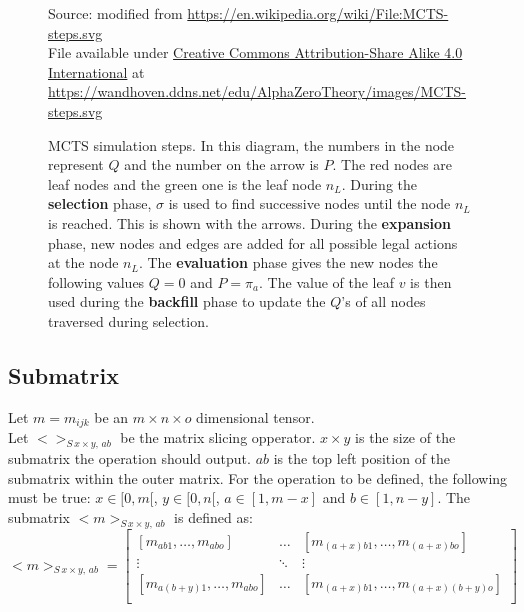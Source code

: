 \documentclass[12pt]{article}
\newcommand{\source}[1]{\caption*{Source: {#1}} }
\begin{document}
\begin{figure}
    \centering
	\captionsetup{width=.9\linewidth}
    
		\caption[width=0.7\columnwidth]{MCTS simulation steps. In this diagram, the numbers in the node represent \(Q\) and the number on the arrow is \(P\). The red nodes are leaf nodes and the green one is the leaf node \(n_L\). During the \textbf{selection} phase, \(\sigma\) is used to find successive nodes until the node \(n_L\) is reached. This is shown with the arrows. During the \textbf{expansion} phase, new nodes and edges are added for all possible legal actions at the node \(n_L\). The \textbf{evaluation} phase gives the new nodes the following values \(Q = 0\) and \(P = \pi_a\). The value of the leaf \(v\) is then used during the \textbf{backfill} phase to update the \(Q\)'s of all nodes traversed during selection.}
		\source{modified from \url{https://en.wikipedia.org/wiki/File:MCTS-steps.svg}\\File available under \href{https://creativecommons.org/licenses/by-sa/4.0/deed.en}{Creative Commons Attribution-Share Alike 4.0 International} at \url{https://wandhoven.ddns.net/edu/AlphaZeroTheory/images/MCTS-steps.svg}}
	\label{MCTS-simulation}
\end{figure}

\subsection{Submatrix}
\label{sec:Ref:submatrix}
Let \(m = m_{ijk}\) be an \(m\times n\times o\) dimensional tensor.\\
Let \(<>_{S\,x\times y,\,ab}\) be the matrix slicing opperator. \(x\times y\) is the size of the submatrix the operation should output. \(ab\) is the top left position of the submatrix within the outer matrix.  For the operation to be defined, the following must be true: \(x \in \mathbb [0, m[\), \(y \in \mathbb [0, n[\), \(a  \in [1, m-x]\) and \(b \in [1, n-y]\). The submatrix \(<m>_{S\,x\times y,\,ab}\) is defined as:
\begin{equation}
<m>_{S\,x\times y,\,ab} = 
\left[
\begin{matrix}
[m_{ab1},\dots,m_{abo}] & \dots & [m_{(a+x)b1},\dots,m_{(a+x)bo}]\\
\vdots &  \ddots & \vdots\\
[m_{a(b+y)1},\dots,m_{abo}] & \dots & [m_{(a+x)b1},\dots,m_{(a+x)(b+y)o}]\\
\end{matrix}\right]
\end{equation}
\end{document}
